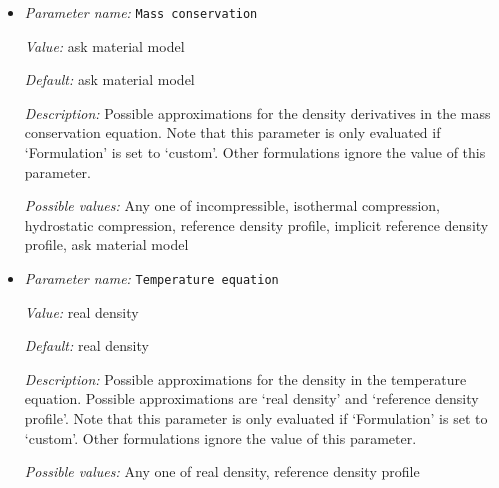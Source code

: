 \begin{itemize}



{\it Possible values:} Any one of isothermal compression, custom, anelastic liquid approximation, Boussinesq approximation
\item {\it Parameter name:} {\tt Mass conservation}
\label{parameters:Formulation/Mass conservation}
\label{parameters:Formulation/Mass_20conservation}


{\it Value:} ask material model


{\it Default:} ask material model


{\it Description:} Possible approximations for the density derivatives in the mass conservation equation. Note that this parameter is only evaluated if `Formulation' is set to `custom'. Other formulations ignore the value of this parameter.


{\it Possible values:} Any one of incompressible, isothermal compression, hydrostatic compression, reference density profile, implicit reference density profile, ask material model
\item {\it Parameter name:} {\tt Temperature equation}
\label{parameters:Formulation/Temperature equation}
\label{parameters:Formulation/Temperature_20equation}


{\it Value:} real density


{\it Default:} real density


{\it Description:} Possible approximations for the density in the temperature equation. Possible approximations are `real density' and `reference density profile'. Note that this parameter is only evaluated if `Formulation' is set to `custom'. Other formulations ignore the value of this parameter.


{\it Possible values:} Any one of real density, reference density profile
\end{itemize}

